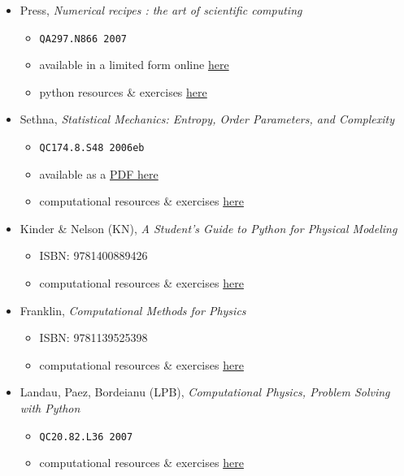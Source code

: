   \begin{itemize}
    \item Press, \textit{Numerical recipes : the art of scientific computing}
    \begin{itemize}
      \item \texttt{QA297.N866 2007} 
      \item available in a limited form online \href{http://numerical.recipes/}{here} 
      \item python resources \&  exercises \href{http://numerical.recipes/nr3_python_tutorial.html}{here}
    \end{itemize}
    \item Sethna, \textit{Statistical Mechanics: Entropy, Order Parameters, and Complexity} 
    \begin{itemize}
      \item \texttt{QC174.8.S48 2006eb} 
      \item available as a \href{http://pages.physics.cornell.edu/\%7Esethna/StatMech/EntropyOrderParametersComplexity.pdf}{PDF here} 
      \item computational resources \&  exercises \href{http://pages.physics.cornell.edu/~sethna/StatMech/ComputerExercises.html}{here}
    \end{itemize}
    \item Kinder \& Nelson (KN), \textit{A Student's Guide to Python for Physical Modeling} 
    \begin{itemize}
      \item ISBN: 9781400889426 
      \item computational resources \&  exercises \href{http://physicalmodelingwithpython.blogspot.com/}{here}
    \end{itemize}
    \item Franklin, \textit{Computational Methods for Physics} 
    \begin{itemize}
      \item ISBN: 9781139525398
      \item computational resources \&  exercises \href{http://people.reed.edu/~jfrankli/Book/downloads/index.html}{here}
    \end{itemize}
    \item Landau, Paez, Bordeianu (LPB), \textit{Computational Physics, Problem Solving with Python} 
    \begin{itemize}
      \item \texttt{QC20.82.L36 2007} 
      \item computational resources \& exercises \href{http://physics.oregonstate.edu/~landaur/Books/CPbook/}{here}

\end{itemize}
\end{itemize}
